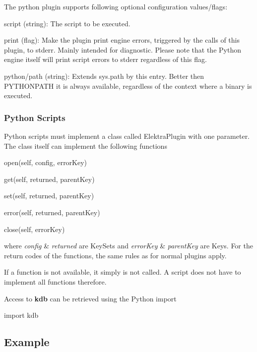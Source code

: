 The python plugin supports following optional configuration values/flags\+:


\begin{DoxyItemize}
\item {\ttfamily script} (string)\+: The script to be executed.
\item {\ttfamily print} (flag)\+: Make the plugin print engine errors, triggered by the calls of this plugin, to stderr. Mainly intended for diagnostic. Please note that the Python engine itself will print script errors to stderr regardless of this flag.
\item {\ttfamily python/path} (string)\+: Extends sys.\+path by this entry. Better then P\+Y\+T\+H\+O\+N\+P\+A\+TH it is always available, regardless of the context where a binary is executed.
\end{DoxyItemize}

\subsubsection*{Python Scripts}

Python scripts must implement a class called {\ttfamily Elektra\+Plugin} with one parameter. The class itself can implement the following functions


\begin{DoxyItemize}
\item open(self, config, error\+Key)
\item get(self, returned, parent\+Key)
\item set(self, returned, parent\+Key)
\item error(self, returned, parent\+Key)
\item close(self, error\+Key)
\end{DoxyItemize}

where {\itshape config} \& {\itshape returned} are Key\+Sets and {\itshape error\+Key} \& {\itshape parent\+Key} are Keys. For the return codes of the functions, the same rules as for normal plugins apply.

If a function is not available, it simply is not called. A script does not have to implement all functions therefore.

Access to {\bfseries kdb} can be retrieved using the Python import


\begin{DoxyCode}
\textcolor{keyword}{import} kdb
\end{DoxyCode}


\subsection*{Example}


